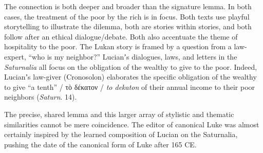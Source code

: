 The connection is both deeper and broader than the signature lemma. %
In both cases, the treatment of the poor by the rich is in focus. %
Both texts use playful storytelling to illustrate the dilemma, %
both are stories within stories, %
and both follow after an ethical dialogue/debate. %
Both also accentuate the theme of hospitality to the poor. %
The Lukan story is framed by a question from a law-expert, %
“who is my neighbor?” %
Lucianʼs dialogues, laws, and letters in the \textit{Saturnalia} all focus on the obligation %
of the wealthy to give to the poor. %
Indeed, Lucianʼs law-giver (Cronosolon) elaborates %
the specific obligation of the wealthy to give “a tenth” / τὸ δέκατον / \textit{to dekaton} %
of their annual income to their poor neighbors (\textit{Saturn}. 14). %

The precise, shared lemma and this larger array of stylistic and thematic %
similarities cannot be mere coincidence. %
The editor of canonical Luke was almost certainly inspired by the learned composition %
of Lucian on the Saturnalia, %
pushing the date of the canonical form of Luke after 165 CE. %